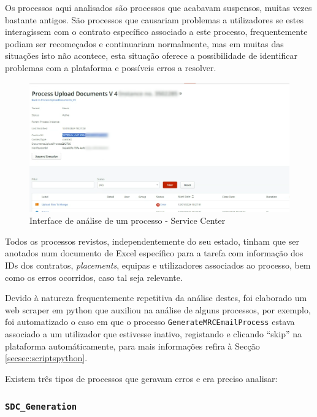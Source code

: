         Os processos aqui analisados são processos que acabavam suspensos, muitas vezes bastante antigos. São processos que causariam problemas a utilizadores se estes interagissem com o contrato específico associado a este processo, frequentemente podiam ser recomeçados e continuariam normalmente, mas em muitas das situações isto não acontece, esta situação oferece a possibilidade de identificar problemas com a plataforma e possíveis erros a resolver.

        \begin{figure}[H]
            \centering
            \includegraphics[width=\textwidth]{imgs/ProcessoServiceCenter.png}
            \caption{Interface de análise de um processo - Service Center}\label{fig:interface_processo_servicecenter}
        \end{figure}

        Todos os processos revistos, independentemente do seu estado, tinham que ser anotados num documento de Excel específico para a tarefa com informação dos IDs dos contratos, \textit{placements}, equipas e utilizadores associados ao processo, bem como os erros ocorridos, caso tal seja relevante.

        Devido à natureza frequentemente repetitiva da análise destes, foi elaborado um web scraper em python que auxiliou na análise de alguns processos, por exemplo, foi automatizado o caso em que o processo \texttt{GenerateMRCEmailProcess} estava associado a um utilizador que estivesse inativo, registando e clicando ``skip'' na plataforma automáticamente, para mais informações refira à Secção \ref{secsec:scriptspython}.

        Existem três tipos de processos que geravam erros e era preciso analisar:

        \subsubsection{\texttt{SDC\_Generation}}\label{secsec:sdc_generation}


